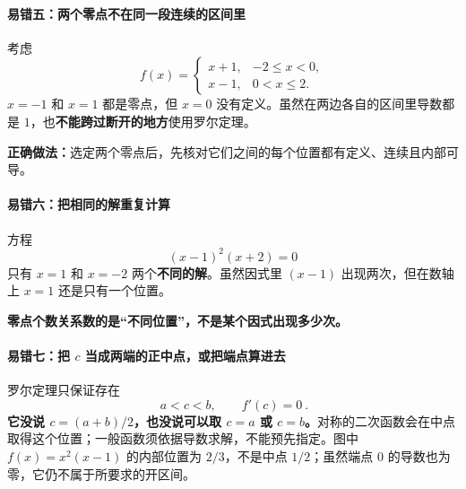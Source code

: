 \begin{trapbox}
\par\medskip
\noindent\begin{minipage}{\linewidth}
\paragraph{易错五：两个零点不在同一段连续的区间里}
\begin{center}\end{center}
\end{minipage}\par\medskip

考虑
\[
f(x)=\begin{cases}x+1,&-2\le x<0,\\x-1,&0<x\le2.\end{cases}
\]
$x=-1$ 和 $x=1$ 都是零点，但 $x=0$ 没有定义。虽然在两边各自的区间里导数都是 $1$，也\textbf{不能跨过断开的地方}使用罗尔定理。

\textbf{正确做法：}选定两个零点后，先核对它们之间的每个位置都有定义、连续且内部可导。
\end{trapbox}
\clearpage
\begin{trapbox}
\par\medskip
\noindent\begin{minipage}{\linewidth}
\paragraph{易错六：把相同的解重复计算}
\begin{center}\end{center}
\end{minipage}\par\medskip

方程
\[
(x-1)^2(x+2)=0
\]
只有 $x=1$ 和 $x=-2$ 两个\textbf{不同的解}。虽然因式里 $(x-1)$ 出现两次，但在数轴上 $x=1$ 还是只有一个位置。

\textbf{零点个数关系数的是“不同位置”，不是某个因式出现多少次。}

\end{trapbox}
\clearpage
\begin{trapbox}
\par\medskip
\noindent\begin{minipage}{\linewidth}
\paragraph{易错七：把 $c$ 当成两端的正中点，或把端点算进去}
\begin{center}\end{center}
\end{minipage}\par\medskip

罗尔定理只保证存在
\[
\boxed{\ a<c<b,\qquad f'(c)=0\ }.
\]
\textbf{它没说 $c=(a+b)/2$，也没说可以取 $c=a$ 或 $c=b$。}对称的二次函数会在中点取得这个位置；一般函数须依据导数求解，不能预先指定。图中 $f(x)=x^2(x-1)$ 的内部位置为 $2/3$，不是中点 $1/2$；虽然端点 $0$ 的导数也为零，它仍不属于所要求的开区间。
\end{trapbox}

